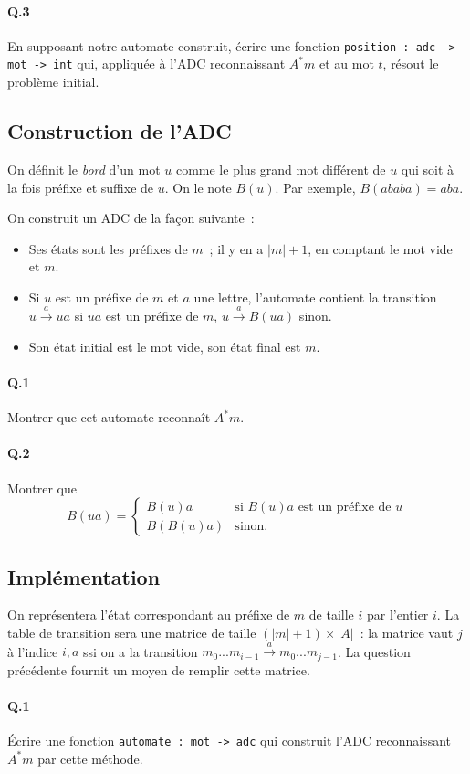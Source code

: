 \documentclass[10pt,a4paper]{article}
\begin{document}
\paragraph{Q.3} En supposant notre automate construit, écrire une fonction 
\texttt{position : adc -> mot -> int} qui, appliquée à l'ADC reconnaissant $A^* m$ 
et au mot $t$, résout le problème initial.
\subsection{Construction de l'ADC}
On définit le \textit{bord} d'un mot $u$ comme le plus grand mot différent de $u$ 
qui soit à la fois préfixe et suffixe de $u$. On le note $B(u)$. Par exemple,
$B(ababa) = aba$.

On construit un ADC de la façon suivante~:
\begin{itemize}
\item Ses états sont les préfixes de $m$~; il y en a $|m|+1$, en comptant le mot
vide et $m$.
\item Si $u$ est un préfixe de $m$ et $a$ une lettre, l'automate contient la 
transition $u \xrightarrow{a} ua$ si $ua$ est un préfixe de $m$, 
$u \xrightarrow{a} B(ua)$ sinon.
\item Son état initial est le mot vide, son état final est $m$.
\end{itemize}
\paragraph{Q.1} Montrer que cet automate reconnaît $A^* m$.
\paragraph{Q.2} Montrer que 
\[B(ua) = \left\{ 
    \begin{array}{ll}
		B(u)a  & \mbox{si } B(u)a\mbox{ est un préfixe de }u \\
		B(B(u)a) & \mbox{sinon.}
	\end{array} \right. \]
\subsection{Implémentation}
On représentera l'état correspondant au préfixe de $m$ de taille $i$ par l'entier
$i$. La table de transition sera une matrice de taille $(|m|+1) \times |A|$~:
la matrice vaut $j$ à l'indice $i,a$ ssi on a la transition $m_0 ... m_{i-1} 
\xrightarrow{a} m_0 ... m_{j-1}$. La question précédente fournit un moyen de 
remplir cette matrice.
\paragraph{Q.1} Écrire une fonction \texttt{automate : mot -> adc} qui construit 
l'ADC reconnaissant $A^* m$ par cette méthode.
\end{document}
